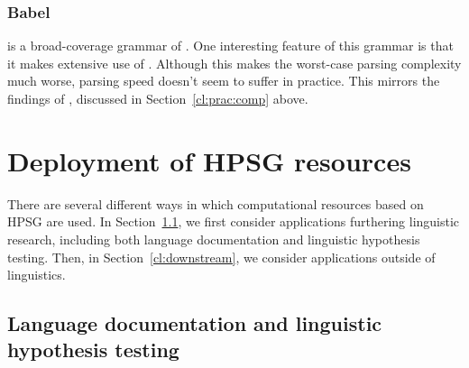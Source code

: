 \documentclass[output=paper,nonflat]{langsci/langscibook}
\begin{document}
\subsubsection{Babel}
\label{cl:other:babel}

 is a broad-coverage grammar of  \citep{Babel,Mueller99a}.
One interesting feature of this grammar is that
it makes extensive use of  \citep{Mueller2004b}.
Although this makes the worst-case parsing complexity much worse,
parsing speed doesn't seem to suffer in practice.
This mirrors the findings of \citet{Carroll94},
discussed in Section~\ref{cl:prac:comp} above.






\section{Deployment of HPSG resources}
\label{cl:deployment}

There are several different ways in which computational resources
based on HPSG are used.
In Section~\ref{cl:lang-doc}, we first consider applications furthering linguistic research,
including both language documentation and linguistic hypothesis testing.
Then, in Section~\ref{cl:downstream}, we consider applications outside of linguistics.


\subsection{Language documentation and linguistic hypothesis testing}
\label{cl:lang-doc}

\end{document}
